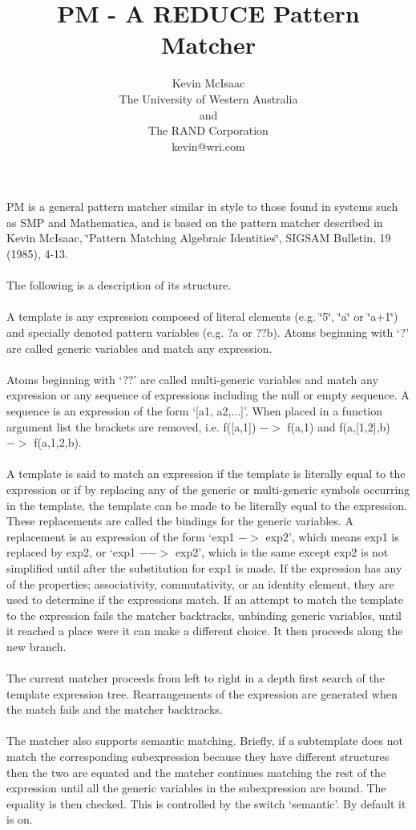 \documentclass{article}
\title{PM - A REDUCE Pattern Matcher}
\author{Kevin McIsaac \\
	The University of Western Australia \\
	 and \\
	 The RAND Corporation \\
	 kevin@wri.com}
\date{}
\begin{document}
\maketitle

PM is a general pattern matcher similar in style to those found in systems
such as SMP and Mathematica, and is based on the pattern matcher described
in Kevin McIsaac, \char`\"{}Pattern Matching Algebraic Identities\char`\"{},
SIGSAM Bulletin, 19 (1985), 4-13. \\
\ \\
The following is a description of its structure. \\
\ \\
A template is any expression composed of literal elements (e.g. \char`\"{}5\char`\"{},
\char`\"{}a\char`\"{} or \char`\"{}a+1\char`\"{}) and specially denoted pattern 
variables (e.g. ?a or ??b). Atoms beginning with `?' are called generic variables 
and match any expression. \\
\ \\
Atoms beginning with `??' are called multi-generic variables and match any
expression or any sequence of expressions including the null or empty
sequence. A sequence is an expression of the form `{[}a1, a2,...{]}'. When
placed in a function argument list the brackets are removed, i.e. f({[}a,1{]})
$->$ f(a,1) and f(a,{[}1,2{]},b) $->$ f(a,1,2,b). \\
\ \\
A template is said to match an expression if the template is literally
equal to the expression or if by replacing any of the generic or
multi-generic symbols occurring in the template, the template can be made
to be literally equal to the expression. These replacements are called the
bindings for the generic variables. A replacement is an expression of the
form `exp1 $->$ exp2', which means exp1 is replaced by exp2, or `exp1 $-->$
exp2', which is the same except exp2 is not simplified until after the
substitution for exp1 is made. If the expression has any of the
properties; associativity, commutativity, or an identity element, they are
used to determine if the expressions match. If an attempt to match the
template to the expression fails the matcher backtracks, unbinding generic
variables, until it reached a place were it can make a different choice.
It then proceeds along the new branch. \\
\ \\
The current matcher proceeds from left to right in a depth first search of
the template expression tree. Rearrangements of the expression are
generated when the match fails and the matcher backtracks. \\
\ \\
The matcher also supports semantic matching. Briefly, if a subtemplate
does not match the corresponding subexpression because they have different
structures then the two are equated and the matcher continues matching the
rest of the expression until all the generic variables in the subexpression
are bound. The equality is then checked. This is controlled by the switch
`semantic'. By default it is on. \\
\end{document}
